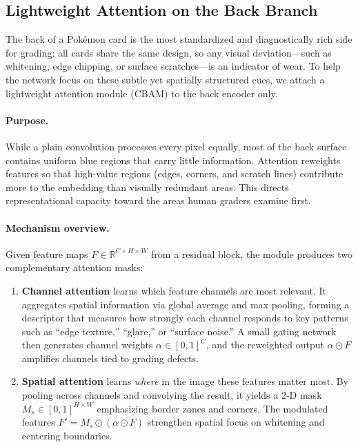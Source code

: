 \documentclass[12pt]{article}
\begin{document}
\subsection{Lightweight Attention on the Back Branch}
\label{subsec:attention-back}

The back of a Pokémon card is the most standardized and diagnostically rich side for grading: 
all cards share the same design, so any visual deviation—such as whitening, edge chipping, or surface scratches—is an indicator of wear. 
To help the network focus on these subtle yet spatially structured cues, we attach a lightweight attention module (CBAM) to the back encoder only.

\paragraph{Purpose.}
While a plain convolution processes every pixel equally, most of the back surface contains uniform blue regions that carry little information. 
Attention reweights features so that high-value regions (edges, corners, and scratch lines) contribute more to the embedding than visually redundant areas. 
This directs representational capacity toward the areas human graders examine first.

\paragraph{Mechanism overview.}
Given feature maps $F \in \mathbb{R}^{C \times H \times W}$ from a residual block, 
the module produces two complementary attention masks:
\begin{enumerate}
    \item \textbf{Channel attention} learns which feature channels are most relevant.  
    It aggregates spatial information via global average and max pooling, forming a descriptor that measures how strongly each channel responds to key patterns such as ``edge texture,'' ``glare,'' or ``surface noise.''  
    A small gating network then generates channel weights $\alpha \in [0,1]^C$, and the reweighted output $\alpha \odot F$ amplifies channels tied to grading defects.
    \item \textbf{Spatial attention} learns \emph{where} in the image these features matter most.  
    By pooling across channels and convolving the result, it yields a 2-D mask $M_s \in [0,1]^{H \times W}$ emphasizing border zones and corners.  
    The modulated features $F' = M_s \odot (\alpha \odot F)$ strengthen spatial focus on whitening and centering boundaries.
\end{enumerate}
\end{document}
